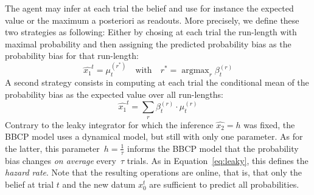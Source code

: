 \documentclass[12pt,english]{article}%
\newcommand{\eql}[1]{\begin{equation}#1\end{equation}}
\DeclareMathOperator{\argmax}{argmax}
\newcommand{\seeEq}[1]{Equation~\ref{eq:#1}}
\begin{document}
The agent may infer at each trial the belief
and use for instance the expected value or the maximum a posteriori as readouts.
More precisely, we define these two strategies as following:
Either by chosing
at each trial the run-length with maximal probability
and then assigning the predicted probability bias 
as the probability bias for that run-length:
\eql{
\hat{x_1}^t = \mu^{(r^\ast)}_{t} \quad \text{with} \quad r^\ast = \argmax_r \beta^{(r)}_{t}
}
A second strategy consists in computing 
at each trial the conditional mean of the probability bias
as the expected value over all run-lengths:
\eql{
\hat{x_1}^t = \sum_{r} \beta^{(r)}_{t} \cdot \mu^{(r)}_{t}
}
Contrary to the leaky integrator for which the inference $\hat{x_2}=h$ was fixed, 
the BBCP model uses a dynamical model, but still with only one parameter. 
As for the latter, this parameter~$h=\frac 1 \tau$ informs the BBCP model 
that the probability bias  changes \emph{on average} every~$\tau$ trials.
As in \seeEq{leaky}, this defines the \emph{hazard rate}.
Note that the resulting operations are online, that is,
that only the belief at trial $t$ and the new datum $x_0^t$ 
are sufficient to predict all probabilities.
\end{document}
